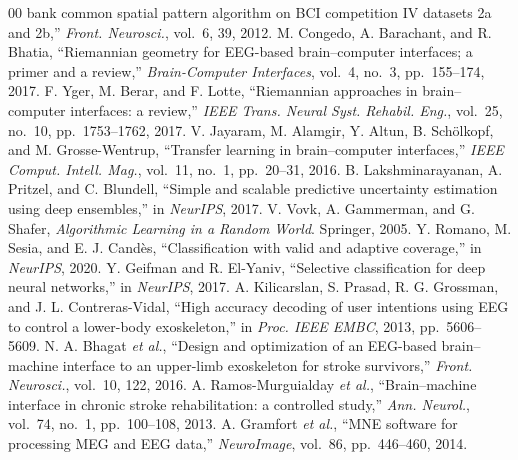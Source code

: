 \documentclass[journal]{IEEEtran}
\begin{document}
\begin{thebibliography}{00}
bank common spatial pattern algorithm on BCI competition IV datasets 2a and 2b,''
\emph{Front. Neurosci.}, vol.~6, 39, 2012.
 M. Congedo, A. Barachant, and R. Bhatia, ``Riemannian geometry
for EEG-based brain--computer interfaces; a primer and a review,''
\emph{Brain-Computer Interfaces}, vol.~4, no.~3, pp.~155--174, 2017.
 F. Yger, M. Berar, and F. Lotte, ``Riemannian approaches in
brain--computer interfaces: a review,'' \emph{IEEE Trans. Neural Syst. Rehabil.
Eng.}, vol.~25, no.~10, pp.~1753--1762, 2017.
 V. Jayaram, M. Alamgir, Y. Altun, B. Sch\"olkopf, and
M. Grosse-Wentrup, ``Transfer learning in brain--computer interfaces,'' \emph{IEEE
Comput. Intell. Mag.}, vol.~11, no.~1, pp.~20--31, 2016.
 B. Lakshminarayanan, A. Pritzel, and C. Blundell,
``Simple and scalable predictive uncertainty estimation using deep ensembles,'' in
\emph{NeurIPS}, 2017.
 V. Vovk, A. Gammerman, and G. Shafer, \emph{Algorithmic Learning
in a Random World}. Springer, 2005.
 Y. Romano, M. Sesia, and E. J. Cand\`es, ``Classification with
valid and adaptive coverage,'' in \emph{NeurIPS}, 2020.
 Y. Geifman and R. El-Yaniv, ``Selective classification for deep
neural networks,'' in \emph{NeurIPS}, 2017.
 A. Kilicarslan, S. Prasad, R. G. Grossman, and
J. L. Contreras-Vidal, ``High accuracy decoding of user intentions using EEG to
control a lower-body exoskeleton,'' in \emph{Proc. IEEE EMBC}, 2013, pp.~5606--5609.
 N. A. Bhagat \emph{et al.}, ``Design and optimization of an
EEG-based brain--machine interface to an upper-limb exoskeleton for stroke
survivors,'' \emph{Front. Neurosci.}, vol.~10, 122, 2016.
 A. Ramos-Murguialday \emph{et al.}, ``Brain--machine interface in
chronic stroke rehabilitation: a controlled study,'' \emph{Ann. Neurol.}, vol.~74,
no.~1, pp.~100--108, 2013.
 A. Gramfort \emph{et al.}, ``MNE software for processing MEG
and EEG data,'' \emph{NeuroImage}, vol.~86, pp.~446--460, 2014.
\end{thebibliography}
\end{document}
